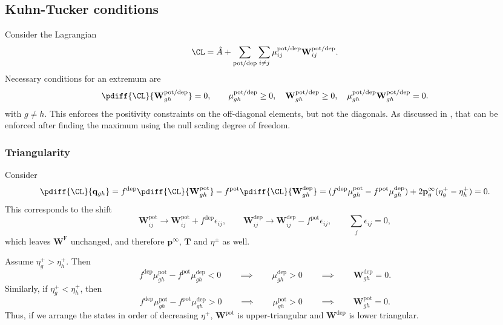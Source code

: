 \documentclass{article} %
\newcommand{\pr}{\mathbf{p}}
\newcommand{\eq}{\pr^\infty}
\newcommand{\fpt}{\mathbf{T}}
\newcommand{\w}{\mathbf{w}}
\newcommand{\W}{\mathbf{W}}
\newcommand{\enc}{\mathbf{q}}
\newcommand{\frg}{\W^{\mathrm{F}}}
\newcommand{\pot}{^{\text{pot}}}
\newcommand{\dep}{^{\text{dep}}}
\newcommand{\potdep}{^{\text{pot/dep}}}
\begin{document}
\subsection{Kuhn-Tucker conditions}\label{sec:kuhntucker}

Consider the Lagrangian
%
\begin{equation}\label{eq:lagrangian}
  \CL = \hat{A} + \sum_{\text{pot/dep}}\sum_{i\neq j} \mu\potdep _{ij} \W\potdep _{ij} .%
\end{equation}
%
Necessary conditions for an extremum are
%
\begin{equation}\label{eq:extremum}
  \pdiff{\CL}{\W\potdep _{gh}} = 0,
  \qquad
    \mu\potdep _{gh} \geq 0,\quad
    \W\potdep _{gh} \geq 0,\quad
    \mu\potdep _{gh}\W\potdep _{gh} = 0.
\end{equation}
%
with $g \neq h$. This enforces the positivity constraints on the off-diagonal elements, but not the diagonals. As discussed in , that can be enforced after finding the maximum using the null scaling degree of freedom.

\subsubsection{Triangularity}\label{sec:triangular}

Consider
%
\begin{equation}\label{eq:shiftqderiv}
  \pdiff{\CL}{\enc_{gh}} =
  f\dep  \pdiff{\CL}{\W\pot _{gh}} - f\pot  \pdiff{\CL}{\W\dep _{gh}}
   = (f\dep  \mu\pot _{gh} - f\pot  \mu\dep _{gh}) + 2\eq_g (\eta^+_g - \eta^+_h)
   = 0.
\end{equation}
%
This corresponds to the shift
%
\begin{equation}\label{eq:shiftq}
  \W\pot _{ij} \to \W\pot _{ij} + f\dep \epsilon_{ij},
  \qquad
  \W\dep _{ij} \to \W\dep _{ij} - f\pot \epsilon_{ij},
  \qquad
  \sum_j \epsilon_{ij} = 0,
\end{equation}
%
which leaves $\frg$ unchanged, and therefore $\eq$, $\fpt$ and $\eta^\pm$ as well.

Assume $\eta^+_g > \eta^+_h$. Then
%
\begin{equation}\label{eq:lowertriangular}
 f\dep  \mu\pot _{gh} - f\pot  \mu\dep _{gh} <0
 \qquad\implies\qquad
 \mu\dep _{gh} >0
 \qquad\implies\qquad
 \W\dep _{gh}=0.
\end{equation}
%
Similarly, if $\eta^+_g < \eta^+_h$, then
%
\begin{equation}\label{eq:uppertriangular}
 f\dep  \mu\pot _{gh} - f\pot  \mu\dep _{gh} > 0
 \qquad\implies\qquad
 \mu\pot _{gh} >0
 \qquad\implies\qquad
 \W\pot _{gh}=0.
\end{equation}
%
Thus, if we arrange the states in order of decreasing $\eta^+$, $\W\pot $ is upper-triangular and $\W\dep $ is lower triangular.
\end{document}
